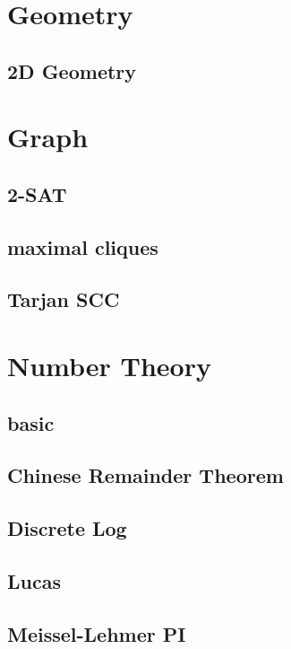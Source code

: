 \section{Geometry}
\subsection{2D Geometry}


\section{Graph}
\subsection{2-SAT}

\subsection{maximal cliques}

\subsection{Tarjan SCC}


\section{Number Theory}
\subsection{basic}

\subsection{Chinese Remainder Theorem}

\subsection{Discrete Log}

\subsection{Lucas}

\subsection{Meissel-Lehmer PI}

